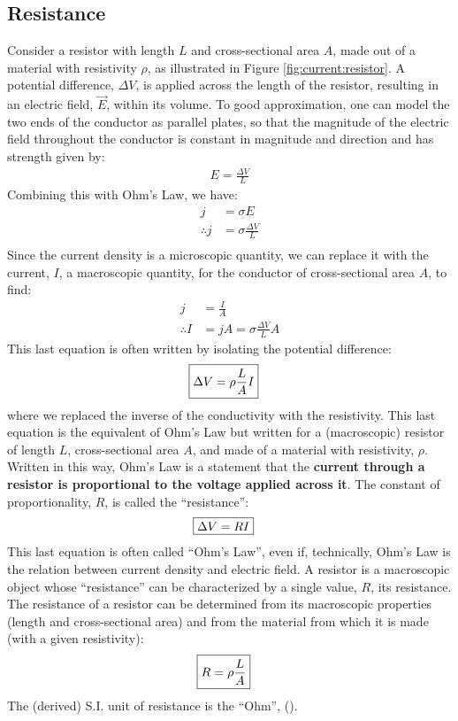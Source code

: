 \subsection{Resistance}
Consider a resistor with length $L$ and cross-sectional area $A$, made out of a material with resistivity $\rho$, as illustrated in Figure \ref{fig:current:resistor}.
A potential difference, $\Delta V$, is applied across the length of the resistor, resulting in an electric field, $\vec E$, within its volume. To good approximation, one can model the two ends of the conductor as parallel plates, so that the magnitude of the electric field throughout the conductor is constant in magnitude and direction and has strength given by:
\begin{align*}
E=\frac{\Delta V}{L}
\end{align*}
Combining this with Ohm's Law, we have:
\begin{align*}
j&=\sigma E\\
\therefore j&=\sigma\frac{\Delta V}{L}\\
\end{align*}
Since the current density is a microscopic quantity, we can replace it with the current, $I$, a macroscopic quantity, for the conductor of cross-sectional area $A$, to find:
\begin{align*}
j&=\frac{I}{A}\\
\therefore I&=jA=\sigma\frac{\Delta V}{L}A
\end{align*}
This last equation is often written by isolating the potential difference:
\begin{align*}
\Aboxed{\Delta V = \rho \frac{L}{A} I}
\end{align*}
where we replaced the inverse of the conductivity with the resistivity. This last equation is the equivalent of Ohm's Law but written for a (macroscopic) resistor of length $L$, cross-sectional area $A$, and made of a material with resistivity, $\rho$. Written in this way, Ohm's Law is a statement that the \textbf{current through a resistor is proportional to the voltage applied across it}. The constant of proportionality, $R$, is called the ``resistance'':
\begin{align*}
\Aboxed{\Delta V = RI}
\end{align*}
This last equation is often called ``Ohm's Law'', even if, technically, Ohm's Law is the relation between current density and electric field. A resistor is a macroscopic object whose ``resistance'' can be characterized by a single value, $R$, its resistance. The resistance of a resistor can be determined from its macroscopic properties (length and cross-sectional area) and from the material from which it is made (with a given resistivity):
\begin{align*}
\Aboxed{R = \rho \frac{L}{A} }
\end{align*}
The (derived) S.I. unit of resistance is the ``Ohm'', (\si{\Omega}).


